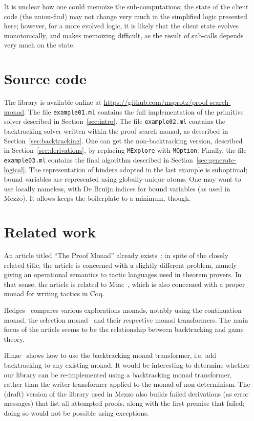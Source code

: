 \documentclass{easychair}
\def\li{\lstinline}
\newcommand{\sref}[1]{Section~\ref{sec:#1}}
\begin{document}
It is unclear how one could memoize the sub-computations; the state of the
client code (the union-find) may not change very much in the simplified logic
presented here; however, for a more evolved logic, it is likely that the client
state evolves monotonically, and makes memoizing difficult, as the result of
sub-calls depends very much on the state.

\section{Source code}

The library is available online at
\url{https://github.com/msprotz/proof-search-monad}. The file \li+example01.ml+
contains the full implementation of the primitive solver described in
\sref{intro}. The file \li+example02.ml+ contains the backtracking solver
written within the proof search monad, as described in \sref{backtracking}. One
can get the non-backtracking version, described in \sref{derivations}, by
replacing \li+MExplore+ with \li+MOption+. Finally, the file \li+example03.ml+
contains the final algorithm described in \sref{generate-logical}. The
representation of binders adopted in the last example is suboptimal; bound
variables are represented using globally-unique atoms. One may want to use
locally nameless, with De Bruijn indices for bound variables (as used in Mezzo).
It allows keeps the boilerplate to a minimum, though.

\section{Related work}

An article titled ``The Proof Monad'' already exists~\cite{kirchner-munoz-10};
in spite of the closely related title, the article is concerned with a slightly
different problem, namely giving an operational semantics to tactic languages
used in theorem provers. In that sense, the article is related to
Mtac~\cite{ziliani-13}, which is also concerned with a proper monad for writing
tactics in Coq.

Hedges~\cite{hedges-14} compares various explorations monads, notably using the
continuation monad, the selection monad~\cite{escardo-2010} and their respective
monad transformers. The main focus of the article seems to be the relationship
between backtracking and game theory.

Hinze~\cite{hinze-00} shows how to use the backtracking monad transformer, i.e.
add backtracking to any existing monad. It would be interesting to determine
whether our library can be re-implemented using a backtracking monad
transformer, rather than the writer transformer applied to the monad of
non-determinism. The (draft) version of the library used in Mezzo also builds
failed derivations (as error messages) that list all attempted proofs, along
with the first premise that failed; doing so would not be possible using
exceptions.
\end{document}
